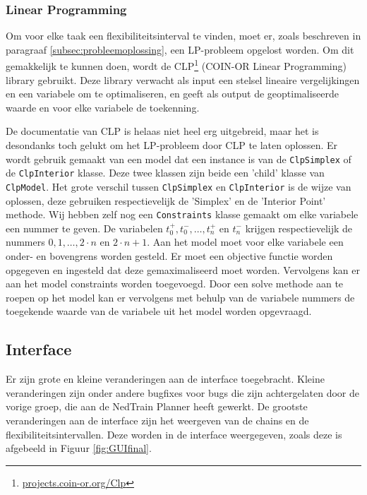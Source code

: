 \subsubsection{Linear Programming}
Om voor elke taak een flexibiliteitsinterval te vinden, moet er, zoals beschreven in paragraaf \ref{subsec:probleemoplossing}, een LP-probleem opgelost worden. Om dit gemakkelijk te kunnen doen, wordt de CLP\footnote{\href{https://projects.coin-or.org/Clp}{projects.coin-or.org/Clp}} (COIN-OR Linear Programming) library gebruikt. Deze library verwacht als input een stelsel lineaire vergelijkingen en een variabele om te optimaliseren, en geeft als output de geoptimaliseerde waarde en voor elke variabele de toekenning.

De documentatie van CLP is helaas niet heel erg uitgebreid, maar het is desondanks toch gelukt om het LP-probleem door CLP te laten oplossen. Er wordt gebruik gemaakt van een model dat een instance is van de \texttt{ClpSimplex} of de \texttt{ClpInterior} klasse. Deze twee klassen zijn beide een 'child' klasse van \texttt{ClpModel}. Het grote verschil tussen \texttt{ClpSimplex} en \texttt{ClpInterior} is de wijze van oplossen, deze gebruiken respectievelijk de 'Simplex' en de 'Interior Point' methode. Wij hebben zelf nog een \texttt{Constraints} klasse gemaakt om elke variabele een nummer te geven. De variabelen $t^+_0, t^-_0, \ldots, t^+_n$ en $t^-_n$ krijgen respectievelijk de nummers $0, 1, \ldots, 2 \cdot n$ en $2 \cdot n + 1$. Aan het model moet voor elke variabele een onder- en bovengrens worden gesteld. Er moet een objective functie worden opgegeven en ingesteld dat deze gemaximaliseerd moet worden. Vervolgens kan er aan het model constraints worden toegevoegd. Door een solve methode aan te roepen op het model kan er vervolgens met behulp van de variabele nummers de toegekende waarde van de variabele uit het model worden opgevraagd. 

\subsection{Interface}
Er zijn grote en kleine veranderingen aan de interface toegebracht. Kleine veranderingen zijn onder andere bugfixes voor bugs die zijn achtergelaten door de vorige groep, die aan de NedTrain Planner heeft gewerkt. De grootste veranderingen aan de interface zijn het weergeven van de chains en de flexibiliteitsintervallen. Deze worden in de interface weergegeven, zoals deze is afgebeeld in Figuur \ref{fig:GUIfinal}.

